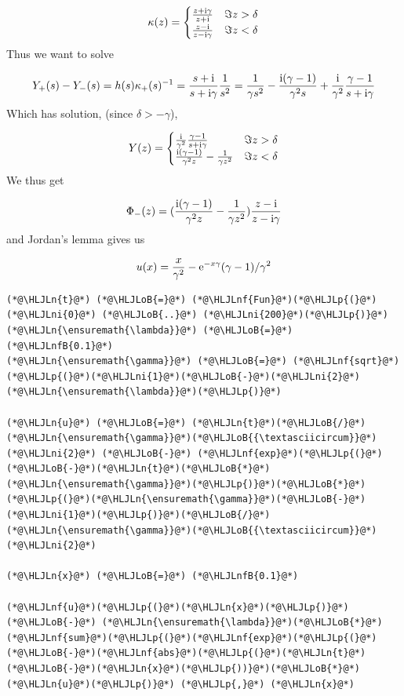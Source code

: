 \documentclass[12pt,a4paper]{article}
\newcommand{\HLJLn}[1]{#1}
\newcommand{\HLJLnf}[1]{\textcolor[RGB]{66,102,213}{#1}}
\newcommand{\HLJLnfB}[1]{\textcolor[RGB]{59,151,46}{#1}}
\newcommand{\HLJLni}[1]{\textcolor[RGB]{59,151,46}{#1}}
\newcommand{\HLJLoB}[1]{\textcolor[RGB]{102,102,102}{\textbf{#1}}}
\newcommand{\HLJLp}[1]{#1}
\def\I{ {\rm i} }
\def\E{ {\rm e} }
\begin{document}
\[
\kappa(z) = \begin{cases}
    {z+\I  \gamma \over z + \I} & \Im z > \delta\\
    {z-\I  \over z-\I  \gamma} & \Im z < \delta 
    \end{cases}
\]
Thus we want to solve

\[
Y_+(s) - Y_-(s) = h(s) \kappa_+(s)^{-1} = {s + \I \over s + \I  \gamma} { 1 \over s^2} = {1 \over \gamma s^2} - {\I ( \gamma - 1) \over \gamma^2 s} + {\I \over \gamma^2 }{  \gamma - 1 \over s+ \I  \gamma}
\]
Which has solution, (since $\delta > - \gamma$), 

\[
Y(z) = \begin{cases}
   {\I \over \gamma^2 }{  \gamma - 1 \over s+ \I \gamma} & \Im z > \delta\\
 {\I ( \gamma - 1) \over \gamma^2 z} - {1 \over \gamma z^2} & \Im z < \delta 
    \end{cases}
\]
We thus get

\[
\Phi_-(z) = ({\I ( \gamma - 1) \over \gamma^2 z} - {1 \over \gamma z^2})     {z-\I  \over z-\I  \gamma} 
\]
and Jordan's lemma gives us

\[
u(x) = {x \over \gamma^2} - \E^{-x \gamma}(\gamma-1)/\gamma^2
\]

\begin{lstlisting}
(*@\HLJLn{t}@*) (*@\HLJLoB{=}@*) (*@\HLJLnf{Fun}@*)(*@\HLJLp{(}@*)(*@\HLJLni{0}@*) (*@\HLJLoB{..}@*) (*@\HLJLni{200}@*)(*@\HLJLp{)}@*)
(*@\HLJLn{\ensuremath{\lambda}}@*) (*@\HLJLoB{=}@*) (*@\HLJLnfB{0.1}@*)
(*@\HLJLn{\ensuremath{\gamma}}@*) (*@\HLJLoB{=}@*) (*@\HLJLnf{sqrt}@*)(*@\HLJLp{(}@*)(*@\HLJLni{1}@*)(*@\HLJLoB{-}@*)(*@\HLJLni{2}@*)(*@\HLJLn{\ensuremath{\lambda}}@*)(*@\HLJLp{)}@*)

(*@\HLJLn{u}@*) (*@\HLJLoB{=}@*) (*@\HLJLn{t}@*)(*@\HLJLoB{/}@*)(*@\HLJLn{\ensuremath{\gamma}}@*)(*@\HLJLoB{{\textasciicircum}}@*)(*@\HLJLni{2}@*) (*@\HLJLoB{-}@*) (*@\HLJLnf{exp}@*)(*@\HLJLp{(}@*)(*@\HLJLoB{-}@*)(*@\HLJLn{t}@*)(*@\HLJLoB{*}@*)(*@\HLJLn{\ensuremath{\gamma}}@*)(*@\HLJLp{)}@*)(*@\HLJLoB{*}@*)(*@\HLJLp{(}@*)(*@\HLJLn{\ensuremath{\gamma}}@*)(*@\HLJLoB{-}@*)(*@\HLJLni{1}@*)(*@\HLJLp{)}@*)(*@\HLJLoB{/}@*)(*@\HLJLn{\ensuremath{\gamma}}@*)(*@\HLJLoB{{\textasciicircum}}@*)(*@\HLJLni{2}@*)

(*@\HLJLn{x}@*) (*@\HLJLoB{=}@*) (*@\HLJLnfB{0.1}@*)

(*@\HLJLnf{u}@*)(*@\HLJLp{(}@*)(*@\HLJLn{x}@*)(*@\HLJLp{)}@*) (*@\HLJLoB{-}@*) (*@\HLJLn{\ensuremath{\lambda}}@*)(*@\HLJLoB{*}@*)(*@\HLJLnf{sum}@*)(*@\HLJLp{(}@*)(*@\HLJLnf{exp}@*)(*@\HLJLp{(}@*)(*@\HLJLoB{-}@*)(*@\HLJLnf{abs}@*)(*@\HLJLp{(}@*)(*@\HLJLn{t}@*)(*@\HLJLoB{-}@*)(*@\HLJLn{x}@*)(*@\HLJLp{))}@*)(*@\HLJLoB{*}@*)(*@\HLJLn{u}@*)(*@\HLJLp{)}@*) (*@\HLJLp{,}@*) (*@\HLJLn{x}@*)
\end{lstlisting}
\end{document}
